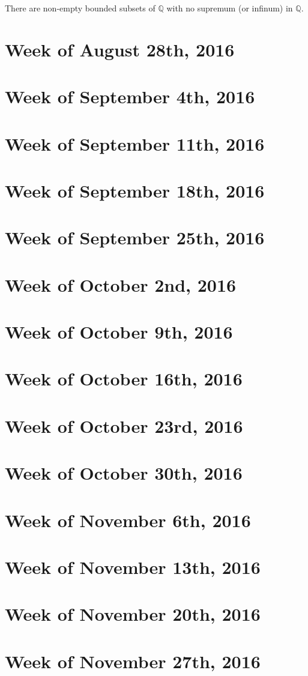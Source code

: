 \documentclass{article}
\begin{document}

\noindent There are non-empty bounded subsets of $\mathbb{Q}$ with no supremum (or infinum) in $\mathbb{Q}$.


\section{Week of August 28th, 2016}
\section{Week of September 4th, 2016}
\section{Week of September 11th, 2016}
\section{Week of September 18th, 2016}
\section{Week of September 25th, 2016}
\section{Week of October 2nd, 2016}
\section{Week of October 9th, 2016}
\section{Week of October 16th, 2016}
\section{Week of October 23rd, 2016}
\section{Week of October 30th, 2016}
\section{Week of November 6th, 2016}
\section{Week of November 13th, 2016}
\section{Week of November 20th, 2016}
\section{Week of November 27th, 2016}
\end{document}
